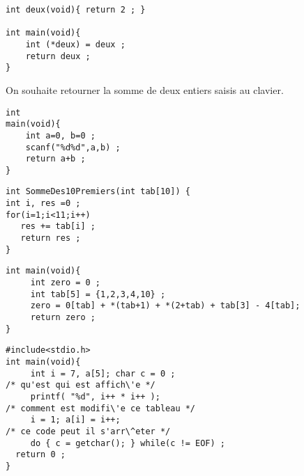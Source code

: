 \begin{frame}[fragile]
\begin{verbatim}
int deux(void){ return 2 ; }

int main(void){ 
    int (*deux) = deux ; 
    return deux ;
}
\end{verbatim}
\end{frame}
\begin{frame}[fragile]
On souhaite retourner la somme de deux entiers
   saisis au clavier.
\begin{verbatim}
int 
main(void){ 
    int a=0, b=0 ;
    scanf("%d%d",a,b) ;
    return a+b ;
}
\end{verbatim}
\end{frame}
\begin{frame}[fragile]
\begin{verbatim}
int SommeDes10Premiers(int tab[10]) {
int i, res =0 ;
for(i=1;i<11;i++)
   res += tab[i] ;
   return res ;
}
\end{verbatim}
\end{frame}
\begin{frame}[fragile]
\begin{verbatim}
int main(void){
     int zero = 0 ;
     int tab[5] = {1,2,3,4,10} ;
     zero = 0[tab] + *(tab+1) + *(2+tab) + tab[3] - 4[tab];
     return zero ;
}
\end{verbatim}
\end{frame}
\begin{frame}[fragile]
\begin{verbatim}
#include<stdio.h>
int main(void){
     int i = 7, a[5]; char c = 0 ;
/* qu'est qui est affich\'e */
     printf( "%d", i++ * i++ );
/* comment est modifi\'e ce tableau */
     i = 1; a[i] = i++;
/* ce code peut il s'arr\^eter */
     do { c = getchar(); } while(c != EOF) ;
  return 0 ;
}
\end{verbatim}
\end{frame}
